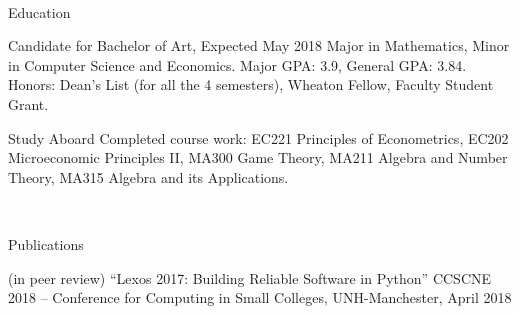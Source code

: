 \documentclass[]{resume-knyte}
\begin{document}



\begin{subheader}{1}
    \\

\end{subheader}

\begin{topic}{Education}


    {Candidate for Bachelor of Art, Expected May 2018}
    {Major in Mathematics, Minor in Computer Science and Economics. Major GPA: 3.9, General GPA: 3.84.\\
    Honors: Dean's List (for all the 4 semesters), Wheaton Fellow, Faculty Student Grant.}


    {Study Aboard}
    {Completed course work: EC221 Principles of Econometrics, EC202 Microeconomic Principles II,
    MA300 Game Theory, MA211 Algebra and Number Theory, MA315 Algebra and its Applications.
    }

    \\ %
\end{topic}


\begin{topic}{Publications}


    {(in peer review)}
    {``Lexos 2017: Building Reliable Software in Python''}
    {CCSCNE 2018 – Conference for Computing in Small Colleges, UNH-Manchester, April 2018}

    \\
\end{topic}
\end{document}
